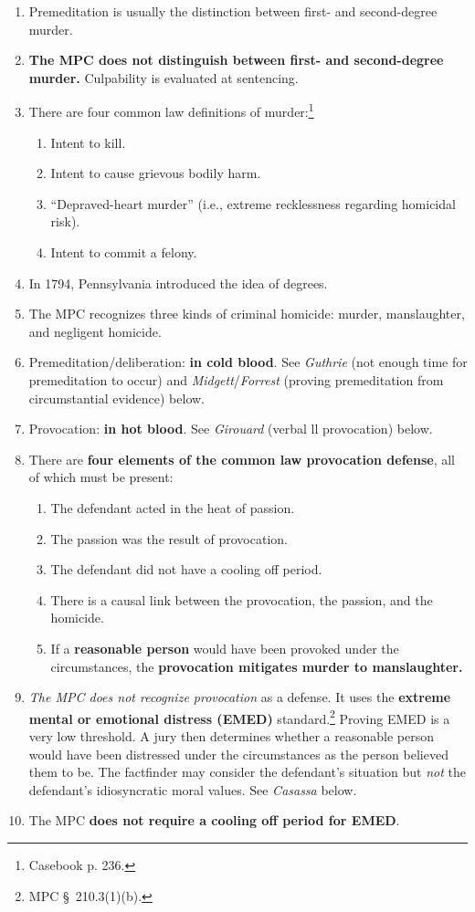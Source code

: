 \begin{enumerate}
    \item Premeditation is usually the distinction between first- and 
    second-degree murder.
    \item \textbf{The MPC does not distinguish between first- and 
    second-degree murder.} Culpability is evaluated at sentencing.
    \item There are four common law definitions of murder:\footnote{Casebook 
    p. 236.}
    \begin{enumerate}
        \item Intent to kill.
        \item Intent to cause grievous bodily harm.
        \item ``Depraved-heart murder'' (i.e., extreme recklessness regarding 
        homicidal risk).
        \item Intent to commit a felony.
    \end{enumerate}
    \item In 1794, Pennsylvania introduced the idea of degrees.
    \item The MPC recognizes three kinds of criminal homicide: murder, 
    manslaughter, and negligent homicide.
    \item Premeditation/deliberation: \textbf{in cold blood}. See 
    \emph{Guthrie} (not enough time for premeditation to occur) and 
    \emph{Midgett}/\emph{Forrest} (proving premeditation from circumstantial 
    evidence) below.
    \item Provocation: \textbf{in hot blood}. See \emph{Girouard} (verbal 
    ll
    provocation) below.
    \item There are \textbf{four elements of the common law provocation 
    defense}, all of which must be present:
    \begin{enumerate}
        \item The defendant acted in the heat of passion.
        \item The passion was the result of provocation.
        \item The defendant did not have a cooling off period.
        \item There is a causal link between the provocation, the passion, and 
        the homicide.
        \item If a \textbf{reasonable person} would have been provoked under 
        the circumstances, the \textbf{provocation mitigates murder to 
        manslaughter.}
    \end{enumerate}
    \item \emph{The MPC does not recognize provocation} as a defense. It uses 
    the \textbf{extreme mental or emotional distress (EMED)} 
    standard.\footnote{MPC \S\ 210.3(1)(b).} Proving EMED is a very low 
    threshold. A jury then determines whether a reasonable person would have 
    been distressed under the circumstances as the person believed them to be. 
    The factfinder may consider the defendant's situation but \emph{not} the 
    defendant's idiosyncratic moral values. See \emph{Casassa} below.
    \item The MPC \textbf{does not require a cooling off period for EMED}.
\end{enumerate}

